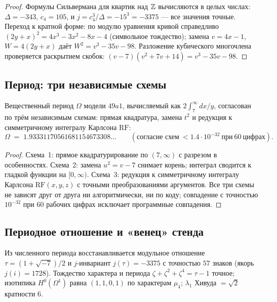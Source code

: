 \begin{proof}
Формулы Сильвермана для квартик над $\mathbb{Z}$ вычисляются в целых числах:
$\Delta=-343$, $c_4=105$, и $j=c_4^3/\Delta=-15^3=-3375$ — все
значения точные. Переход к кратной форме: по модулю уравнения кривой
справедливо $(2y+x)^2=4x^3-3x^2-8x-4$ (символьное тождество);
замена $v=4x-1$, $W=4(2y+x)$ даёт $W^2=v^3-35v-98$. Разложение
кубического многочлена проверяется раскрытием скобок: $(v-7)(v^2+
7v+14)=v^3-35v-98$.
\end{proof}

\subsection{Период: три независимые схемы}

\begin{proposition}\label{prop:klein-period}
Вещественный период $\Omega$ модели $49a1$, вычисляемый как
$2\int_7^\infty dx/y$, согласован по трём независимым схемам:
прямая квадратура, замена $t^2$ и редукция к симметричному интегралу
Карлсона $\mathrm{RF}$:
\[
  \Omega \;=\; 1.93331170561681154673308\ldots
  \qquad (\text{согласие схем}\ <1.4\cdot10^{-32}\ \text{при}\ 60\ \text{цифрах}).
\]
\end{proposition}

\begin{proof}
Схема~1: прямое квадратурирование по $(7,\infty)$ с разрезом в
особенностях. Схема~2: замена $u^2=v-7$ снимает корень; интеграл
сводится к гладкой функции на $[0,\infty)$. Схема~3: редукция к
симметричному интегралу Карлсона $\mathrm{RF}(x,y,z)$ с точными
преобразованиями аргументов. Все три схемы не зависят друг от друга
ни алгоритмически, ни по коду; совпадение с точностью $10^{-32}$
при $60$ рабочих цифрах исключает программные совпадения.
\end{proof}

\subsection{Периодное отношение и «венец» стенда}

\begin{theorem}\label{th:klein-j}
Из численного периода восстанавливается модульное отношение
$\tau=(1+\sqrt{-7})/2$ и $j$-инвариант $j(\tau)=-3375$ с точностью
$57$ знаков (якорь $j(i)=1728$). Тождество характера и периода
$\zeta+\zeta^2+\zeta^4=\tau-1$ точное; изотипика $H^0(\Omega^1)$
равна $(1,1,0,1)$ по характерам $\mu_4$; $\lambda_1$ Хивуда
$=\sqrt2$ кратности $6$.
\end{theorem}

